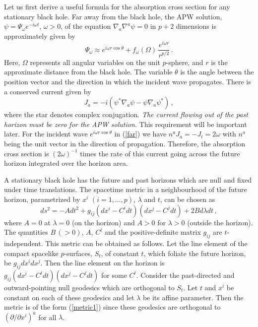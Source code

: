 \documentclass[a4paper,12pt]{article}
\begin{document}
Let us first derive a useful formula for the absorption cross section
for any stationary black hole.  
Far away from the black hole, the APW solution,
$\psi = \Psi_\omega e^{-i\omega t}$, $\omega > 0$, of the equation
$\nabla_a \nabla^a \psi = 0$
in $p+2$ dimensions is approximately given by
\begin{equation}
\Psi_\omega \approx e^{i\omega r\cos\theta} 
+ f_\omega(\Omega)\,\frac{e^{i\omega r}}{r^{p/2}}\,.
\label{far}
\end{equation}
Here, $\Omega$ represents all angular variables on the unit $p$-sphere, and
$r$ is the approximate
distance from the black hole.  The variable $\theta$ is the
angle between 
the position vector and the direction in which the incident wave propagates. 
There is a conserved current given by
\begin{equation}
J_a = -i \left( \psi^*\nabla_a \psi
- \psi \nabla_a \psi^*\right)\,, \label{jmu}
\end{equation}
where the star denotes complex conjugation.  {\it The current flowing out
of the {\it past}
horizon must be zero for the APW solution.}
This requirement will be important later.
For the incident wave
$e^{i\omega r\cos\theta}$ in (\ref{far})
we have $n^a J_a = - J_t = 2\omega$ with $n^a$ being the unit vector in the
direction of propagation.  
Therefore, the absorption cross section is $(2\omega)^{-1}$ times
the rate of this current going across the future horizon integrated over the
horizon area.

A stationary black hole has the future and past horizons 
which are null and fixed under time translations. 
The spacetime metric in a neighbourhood of 
the future horizon, parametrized by $x^i$ $(i=1,\ldots,p)$,
$\lambda$ and $t$, can be chosen as
\begin{equation}
ds^2 = -Adt^2 + g_{ij}(dx^i - C^i dt)(dx^j - C^jdt) + 2Bd\lambda dt\,,
\label{metric1}
\end{equation}
where $A=0$ at $\lambda=0$ (on the horizon) and 
$A>0$ for $\lambda>0$ (outside the
horizon).  The quantities
$B\,(>0)$, $A$, $C^i$ and the positive-definite matrix 
$g_{ij}$ are $t$-independent. 
This metric can be obtained as follows.  Let the line element of the compact 
spacelike 
$p$-surfaces, $S_t$, of constant $t$, which foliate the future horizon, be
$g_{ij}dx^i dx^j$.  Then the line element 
on the horizon is $g_{ij}(dx^i - C^i dt)(dx^j - C^j dt)$ for some $C^i$.
Consider the past-directed and outward-pointing null geodesics which 
are orthogonal to $S_t$.
Let $t$ and $x^i$ be constant on each of these geodesics
and let $\lambda$ be its affine parameter. Then the metric is of the form 
(\ref{metric1}) since these geodesics are orthogonal to
$(\partial/\partial x^i)^a$ for all $\lambda$.
\end{document}
